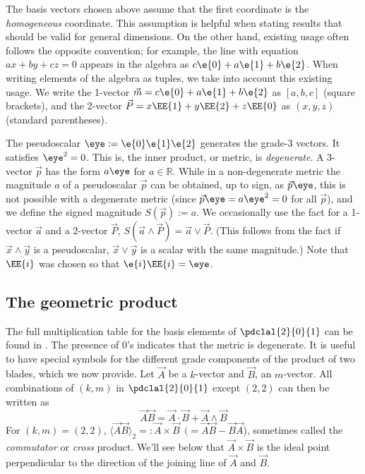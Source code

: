 \documentclass[12pt]{article}
\newcommand{\fvonly}[1]{\ifthenelse{\equal{\isFV}{true}}{#1}{}}
\begin{document}
The basis vectors chosen above assume that the first coordinate is the \emph{homogeneous} coordinate. This assumption is helpful when stating results that should be valid for general dimensions.  On the other hand, existing usage often follows the opposite convention; for example, the line with equation $ax + by + cz = 0$ appears in the algebra as $c\e{0} + a\e{1} + b\e{2}$.  When writing elements of the algebra as tuples, we take into account this existing usage.  We write the 1-vector $\vec{m} = c\e{0} + a\e{1} + b\e{2} $ as $[a,b,c]$ (square brackets), and the 2-vector $\vec{P} = x\EE{1} + y\EE{2} + z\EE{0}$ as $(x,y,z)$ (standard parentheses).

 The pseudoscalar $\eye := \e{0}\e{1}\e{2}$ generates the grade-3 vectors.  It satisfies $\eye^{2} = 0$.  This is, the inner product, or metric, is \emph{degenerate}. %
 A 3-vector $\vec{p}$ has the form $a\eye$ for $a \in \mathbb{R}$. While in a non-degenerate metric the magnitude $a$ of a pseudoscalar $\vec{p}$ can be obtained, up to sign,  as $\vec{p}\eye$, this is not possible with a degenerate metric (since $\vec{p}\eye = a \eye^2 = 0$ for all $\vec{p}$), and we define the signed magnitude $S(\vec{p}) := a$.  We occasionally use the fact for a 1-vector $\vec{a}$ and a 2-vector $\vec{P}$, $S(\vec{a} \wedge \vec{P}) = \vec{a} \vee \vec{P}$.  (This follows from the fact if $\vec{x}\wedge\vec{y}$ is a pseudoscalar, $\vec{x}\vee\vec{y}$ is a scalar with the same magnitude.) Note that  $\EE{i}$ was chosen so that $\e{i}\EE{i}=\eye$. 

\subsection{The geometric product}
The full multiplication table for the basis elements of $\pdclal{2}{0}{1}$  can be found in .  The presence of 0's indicates that the metric is degenerate.
It is useful to have special symbols for the different grade components of the product of two blades, which we now provide.
Let $\vec{A}$ be a $k$-vector and $\vec{B}$, an $m$-vector.  All combinations of $(k,m)$ in $\pdclal{2}{0}{1}$ except $(2,2)$ can then be written as 
\[ \vec{A} \vec{B} = \vec{A}\cdot \vec{B} + \vec{A} \wedge \vec{B} \]
For $(k,m) = (2,2)$,  $\langle \vec{A} \vec{B} \rangle_{2} =: \vec{A} \times \vec{B} ~~(= \vec{A}\vec{B} - \vec{B}\vec{A}$), sometimes called the \emph{commutator} or \emph{cross}  product.  We'll see below that $ \vec{A} \times \vec{B} $ is the ideal point perpendicular to the direction of the joining line of $\vec{A}$ and $\vec{B}$. 
\end{document}

